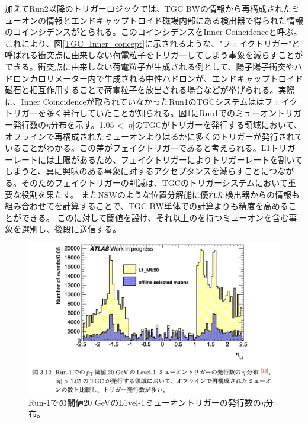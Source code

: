 加えてRun2以降のトリガーロジックでは、TGC BWの情報から再構成されたミューオンの情報とエンドキャップトロイド磁場内部にある検出器で得られた情報のコインシデンスがとられる。このコインシデンスをInner Coincidenceと呼ぶ。これにより、図\ref{TGC_Inner_concept}に示されるような、"フェイクトリガー"と呼ばれる衝突点に由来しない荷電粒子をトリガーしてしまう事象を減らすことができる。衝突点に由来しない荷電粒子が生成される例として、陽子陽子衝突やハドロンカロリメーター内で生成される中性ハドロンが、エンドキャップトロイド磁石と相互作用することで荷電粒子を放出される場合などが挙げられる。実際に、Inner Coincidenceが取られていなかったRun1のTGCシステムははフェイクトリガーを多く発行していたことが知られる。図\ref{TGC_faketrigger}にRun1でのミューオントリガー発行数の$\eta$分布を示す。1.05 < |$\eta$|のTGCがトリガーを発行する領域において、オフラインで再構成されたミューオンよりはるかに多くのトリガーが発行されていることがわかる。この差がフェイクトリガーであると考えられる。L1トリガーレートには上限があるため、フェイクトリガーによりトリガーレートを割いてしまうと、真に興味のある事象に対するアクセプタンスを減らすことにつながる。そのためフェイクトリガーの削減は、TGCのトリガーシステムにおいて重要な役割を果たす。
またNSWのような位置分解能に優れた検出器からの情報も組み合わせて\pt を計算することで、TGC BW単体での計算よりも精度を高めることができる。
この\pt に対して閾値を設け、それ以上の\pt を持つミューオンを含む事象を選別し、後段に送信する。

\begin{figure} 
\centering
\includegraphics[width=16cm]{fig/Intro/TGC_faketrigger.png}
\caption[Run-1での\pt 閾値]{Run-1での\pt 閾値20 GeVのL1vel-1ミューオントリガーの発行数の$\eta$分布。}
\label{TGC_faketrigger}
\end{figure}



